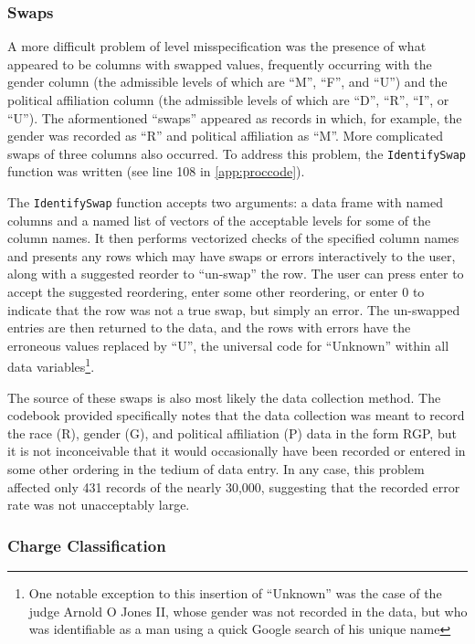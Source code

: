 \subsubsection{Swaps}

A more difficult problem of level misspecification was the presence of what appeared to be columns with swapped values, frequently
occurring with the gender column (the admissible levels of which are ``M'', ``F'', and ``U'') and the political affiliation column
(the admissible levels of which are ``D'', ``R'', ``I'', or ``U''). The aformentioned ``swaps'' appeared as records in which, for
example, the gender was recorded as ``R'' and political affiliation as ``M''. More complicated swaps of three columns also
occurred. To address this problem, the \texttt{IdentifySwap} function was written (see line 108 in \ref{app:proccode}).

The \texttt{IdentifySwap} function accepts two arguments: a data frame with named columns and a named list of vectors of the
acceptable levels for some of the column names. It then performs vectorized checks of the specified column names and presents any
rows which may have swaps or errors interactively to the user, along with a suggested reorder to ``un-swap'' the row. The user can
press enter to accept the suggested reordering, enter some other reordering, or enter 0 to indicate that the row was not a true
swap, but simply an error. The un-swapped entries are then returned to the data, and the rows with errors have the erroneous
values replaced by ``U'', the universal code for ``Unknown'' within all data variables\footnote{One notable exception to this
  insertion of ``Unknown'' was the case of the judge Arnold O Jones II, whose gender was not recorded in the data, but who was
  identifiable as a man using a quick Google search of his unique name}.

The source of these swaps is also most likely the data collection method. The codebook provided specifically notes that the data
collection was meant to record the race (R), gender (G), and political affiliation (P) data in the form RGP, but it is not
inconceivable that it would occasionally have been recorded or entered in some other ordering in the tedium of data entry. In any
case, this problem affected only 431 records of the nearly 30,000, suggesting that the recorded error rate was not unacceptably
large.

\subsubsection{Charge Classification}

